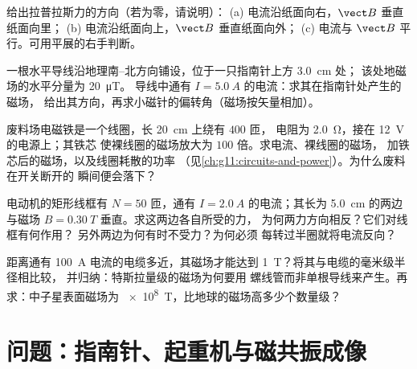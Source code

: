 \begin{exercise}[$\star\star$]\label{exo:g11:magnetic-fields:11}
给出拉普拉斯力的方向（若为零，请说明）：
(a) 电流沿纸面向右，$\vect B$ 垂直纸面向里；
(b) 电流沿纸面向上，$\vect B$ 垂直纸面向外；
(c) 电流与 $\vect B$ 平行。可用平展的右手判断。
\end{exercise}

\begin{exercise}[$\star\star\star$]\label{exo:g11:magnetic-fields:12}
一根水平导线沿地理南–北方向铺设，位于一只指南针上方 \qty{3.0}{cm} 处；
该处地磁场的水平分量为 \qty{20}{\micro T}。
导线中通有 $I = \qty{5.0}{A}$ 的电流：求其在指南针处产生的磁场，
给出其方向，再求小磁针的偏转角（磁场按矢量相加）。
\end{exercise}

\begin{exercise}[$\star\star\star$]\label{exo:g11:magnetic-fields:13}
废料场电磁铁是一个线圈，长 \qty{20}{cm} 上绕有 $400$ 匝，
电阻为 \qty{2.0}{\ohm}，接在 \qty{12}{V} 的电源上；其铁芯
使裸线圈的磁场放大为 $100$ 倍。求电流、裸线圈的磁场，
加铁芯后的磁场，以及线圈耗散的功率
（见\cref{ch:g11:circuits-and-power}）。为什么废料在开关断开的
瞬间便会落下？
\end{exercise}

\begin{exercise}[$\star\star\star$]\label{exo:g11:magnetic-fields:14}
电动机的矩形线框有 $N = 50$ 匝，通有
$I = \qty{2.0}{A}$ 的电流；其长为 \qty{5.0}{cm} 的两边
与磁场 $B = \qty{0.30}{T}$ 垂直。求这两边各自所受的力，
为何两力方向相反？它们对线框有何作用？
另外两边为何有时不受力？为何必须
每转过半圈就将电流反向？
\end{exercise}

\begin{exercise}[$\star\star\star$]\label{exo:g11:magnetic-fields:15}
距离通有 \qty{100}{A} 电流的电缆多近，其磁场才能达到
\qty{1}{T}？将其与电缆的毫米级半径相比较，
并归纳：特斯拉量级的磁场为何要用
螺线管而非单根导线来产生。再求：中子星表面磁场为
\qty{e8}{T}，比地球的磁场高多少个数量级？
\end{exercise}

\section{问题：指南针、起重机与磁共振成像}

